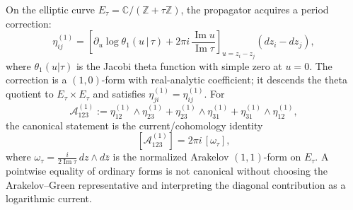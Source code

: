 \begin{proposition}
\label{prop:fourier-genus1-propagator}
On the elliptic curve
$E_\tau = \mathbb{C}/(\mathbb{Z} + \tau\mathbb{Z})$, the
propagator acquires a period correction:
\begin{equation}\label{eq:fourier-genus1-propagator}
\eta^{(1)}_{ij}
=
\left[
\partial_u\log\theta_1(u\,|\,\tau)
+2\pi i\,\frac{\operatorname{Im}u}{\operatorname{Im}\tau}
\right]_{u=z_i-z_j}
(dz_i-dz_j),
\end{equation}
where $\theta_1(u|\tau)$ is the Jacobi theta function with simple
zero at $u = 0$. The correction is a $(1,0)$-form with
real-analytic coefficient; it descends the theta quotient to
$E_\tau \times E_\tau$ and satisfies
$\eta^{(1)}_{ji}=\eta^{(1)}_{ij}$. For
\[
\mathcal A^{(1)}_{123}:=
\eta^{(1)}_{12}\wedge\eta^{(1)}_{23}
+\eta^{(1)}_{23}\wedge\eta^{(1)}_{31}
+\eta^{(1)}_{31}\wedge\eta^{(1)}_{12},
\]
the canonical statement is the current/cohomology identity
\begin{equation}\label{eq:fourier-arnold-failure}
[\mathcal A^{(1)}_{123}]
=2\pi i\,[\omega_\tau],
\end{equation}
where
$\omega_\tau = \frac{i}{2\operatorname{Im}\tau}\,dz \wedge d\bar{z}$
is the normalized Arakelov $(1,1)$-form on $E_\tau$. A pointwise
equality of ordinary forms is not canonical without choosing the
Arakelov--Green representative and interpreting the diagonal
contribution as a logarithmic current.
\end{proposition}

